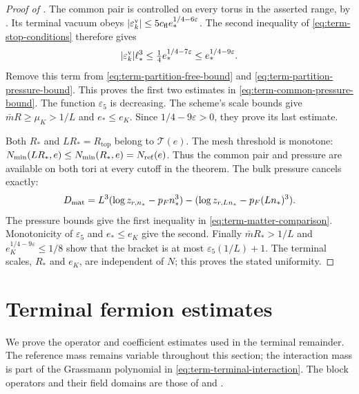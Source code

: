 \begin{proof}[Proof of ]
The common pair is controlled on every torus in the
asserted range, by \cite[Theorem~D]{CoverTuning}.
Its terminal vacuum obeys
$|\varepsilon_k^{\rm v}|
\le5c_{\rm fl}e_*^{1/4-6\varepsilon}$.
The second inequality of \eqref{eq:term-stop-conditions}
therefore gives
\[
 |\varepsilon_k^{\rm v}|\ell_*^3
          \le\tfrac14e_*^{1/4-7\varepsilon}
          \le e_*^{1/4-9\varepsilon}.
\]
Remove this term from
\eqref{eq:term-partition-free-bound} and
\eqref{eq:term-partition-pressure-bound}. This proves
the first two estimates in
\eqref{eq:term-common-pressure-bound}.
The function $\varepsilon_5$ is decreasing.
The scheme's scale bounds give
$\bar mR\ge\mu_K>1/L$ and $e_*\le e_K$.
Since $1/4-9\varepsilon>0$, they prove its last estimate.

Both $R_*$ and $LR_*=R_{\mathrm{top}}$ belong to
$\mathcal T(e)$. The mesh threshold is monotone:
$N_{\min}(LR_*,e)\le N_{\min}(R_*,e)=N_{\rm ref}(e)$.
Thus the common pair and pressure are available on
both tori at every cutoff in the theorem.
The bulk pressure cancels exactly:
\[
 D_{\rm mat}=
 L^3(\log z_{r,n_*}-p_Fn_*^3)
             -(\log z_{r,Ln_*}-p_F(Ln_*)^3).
\]
The pressure bounds give the first inequality in
\eqref{eq:term-matter-comparison}.
Monotonicity of $\varepsilon_5$ and $e_*\le e_K$
give the second. Finally
$\bar mR_*>1/L$ and
$e_K^{1/4-9\varepsilon}\le1/8$ show that the bracket
is at most $\varepsilon_5(1/L)+1$.
The terminal scales, $R_*$ and $e_K$, are independent
of $N$; this proves the stated uniformity.
\end{proof}


\section{Terminal fermion estimates}
\label{subsec:interacting-terminal-operators}

We prove the operator and coefficient estimates used in
the terminal remainder. The reference mass remains variable
throughout this section; the interaction mass is part of the
Grassmann polynomial in \eqref{eq:term-terminal-interaction}.
The block operators and their field domains are those of
\cite[Theorem~A and \S4.2]{FermionBlock} and \cite[\S6]{MaxwellBlock}.

